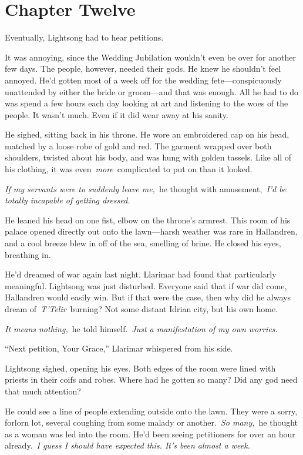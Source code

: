 \section{Chapter Twelve}

Eventually, Lightsong had to hear petitions.

It was annoying, since the Wedding Jubilation wouldn’t even be over for another few days. The people, however, needed their gods. He knew he shouldn’t feel annoyed. He’d gotten most of a week off for the wedding fete—conspicuously unattended by either the bride or groom—and that was enough. All he had to do was spend a few hours each day looking at art and listening to the woes of the people. It wasn’t much. Even if it did wear away at his sanity.

He sighed, sitting back in his throne. He wore an embroidered cap on his head, matched by a loose robe of gold and red. The garment wrapped over both shoulders, twisted about his body, and was hung with golden tassels. Like all of his clothing, it was even~\textit{more}~complicated to put on than it looked.

\textit{If my servants were to suddenly leave me,}~he thought with amusement,~\textit{I’d be totally incapable of getting dressed.}

He leaned his head on one fist, elbow on the throne’s armrest. This room of his palace opened directly out onto the lawn—harsh weather was rare in Hallandren, and a cool breeze blew in off of the sea, smelling of brine. He closed his eyes, breathing in.

He’d dreamed of war again last night. Llarimar had found that particularly meaningful. Lightsong was just disturbed. Everyone said that if war did come, Hallandren would easily win. But if that were the case, then why did he always dream of~\textit{T’Telir}~burning? Not some distant Idrian city, but his own home.

\textit{It means nothing,}~he told himself.~\textit{Just a manifestation of my own worries.}

“Next petition, Your Grace,” Llarimar whispered from his side.

Lightsong sighed, opening his eyes. Both edges of the room were lined with priests in their coifs and robes. Where had he gotten so many? Did any god need that much attention?

He could see a line of people extending outside onto the lawn. They were a sorry, forlorn lot, several coughing from some malady or another.~\textit{So many,}~he thought as a woman was led into the room. He’d been seeing petitioners for over an hour already.~\textit{I guess I should have expected this. It’s been almost a week.}

